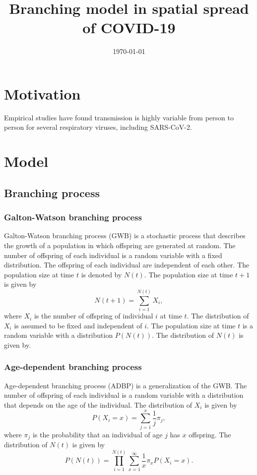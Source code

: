 \documentclass{article}
\title{Branching model in spatial spread of COVID-19}
\date{\today}
\begin{document}
\setlength{\parindent}{0cm}

\maketitle

\section{Motivation}
Empirical studies have found transmission is highly variable from person to person for  several respiratory viruses, including SARS-CoV-2.

\section{Model}
\subsection{Branching process}
\subsubsection*{Galton-Watson branching process}

Galton-Watson branching process (GWB) is a stochastic process that describes the growth of a population in which offspring are generated at random. The number of offspring of each individual is a random variable with a fixed distribution. The offspring of each individual are independent of each other. The population size at time $t$ is denoted by $N(t)$. The population size at time $t+1$ is given by
\begin{equation}
N(t+1) = \sum_{i=1}^{N(t)} X_i,
\end{equation}
where $X_i$ is the number of offspring of individual $i$ at time $t$. The distribution of $X_i$ is assumed to be fixed and independent of $i$. The population size at time $t$ is a random variable with a distribution $P(N(t))$. The distribution of $N(t)$ is given by.

\subsubsection*{Age-dependent branching process}
Age-dependent branching process (ADBP) is a generalization of the GWB. The number of offspring of each individual is a random variable with a distribution that depends on the age of the individual. The distribution of $X_i$ is given by
\begin{equation}
P(X_i = x) = \sum_{j=1}^{x} \frac{1}{j} \pi_j,
\end{equation}
where $\pi_j$ is the probability that an individual of age $j$ has $x$ offspring. The distribution of $N(t)$ is given by
\begin{equation}
P(N(t)) = \prod_{i=1}^{N(t)} \sum_{x=1}^{\infty} \frac{1}{x} \pi_x P(X_i = x).
\end{equation}
\end{document}
